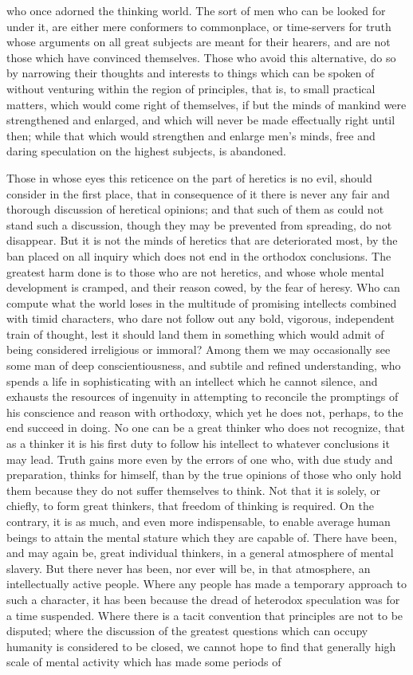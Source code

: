 \documentclass[12pt]{report}
\begin{document}
who once adorned the thinking world. The sort of men who can be looked for under it, are either mere conformers to commonplace, or time-servers for truth whose arguments on all great subjects are meant for their hearers, and are not those which have convinced themselves. Those who avoid this alternative, do so by narrowing their thoughts and interests to things which can be spoken of without venturing within the region of principles, that is, to small practical matters, which would come right of themselves, if but the minds of mankind were strengthened and enlarged, and which will never be made effectually right until then; while that which would strengthen and enlarge men's minds, free and daring speculation on the highest subjects, is abandoned.

Those in whose eyes this reticence on the part of heretics is no evil, should consider in the first place, that in consequence of it there is never any fair and thorough discussion of heretical opinions; and that such of them as could not stand such a discussion, though they may be prevented from spreading, do not disappear. But it is not the minds of heretics that are deteriorated most, by the ban placed on all inquiry which does not end in the orthodox conclusions. The greatest harm done is to those who are not heretics, and whose whole mental development is cramped, and their reason cowed, by the fear of heresy. Who can compute what the world loses in the multitude of promising intellects combined with timid characters, who dare not follow out any bold, vigorous, independent train of thought, lest it should land them in something which would admit of being considered irreligious or immoral? Among them we may occasionally see some man of deep conscientiousness, and subtile and refined understanding, who spends a life in sophisticating with an intellect which he cannot silence, and exhausts the resources of ingenuity in attempting to reconcile the promptings of his conscience and reason with orthodoxy, which yet he does not, perhaps, to the end succeed in doing. No one can be a great thinker who does not recognize, that as a thinker it is his first duty to follow his intellect to whatever conclusions it may lead. Truth gains more even by the errors of one who, with due study and preparation, thinks for himself, than by the true opinions of those who only hold them because they do not suffer themselves to think. Not that it is solely, or chiefly, to form great thinkers, that freedom of thinking is required. On the contrary, it is as much, and even more indispensable, to enable average human beings to attain the mental stature which they are capable of. There have been, and may again be, great individual thinkers, in a general atmosphere of mental slavery. But there never has been, nor ever will be, in that atmosphere, an intellectually active people. Where any people has made a temporary approach to such a character, it has been because the dread of heterodox speculation was for a time suspended. Where there is a tacit convention that principles are not to be disputed; where the discussion of the greatest questions which can occupy humanity is considered to be closed, we cannot hope to find that generally high scale of mental activity which has made some periods of 
\end{document}
